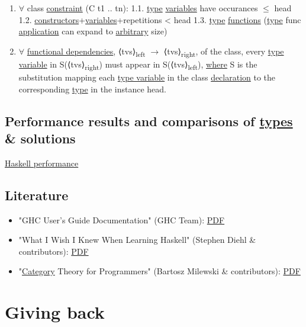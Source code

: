 \documentclass[a4paper,14pt,oneside]{book}
\begin{document}
\begin{enumerate}
\item \(\forall\) class \hyperref[org8d5887d]{constraint} (C t1 .. tn):
1.1. \hyperref[orgcb0bd28]{type} \hyperref[orgd1b5b70]{variables} have occurances \(\le\) head
1.2. \hyperref[org53203b9]{constructors}+\hyperref[orgd1b5b70]{variables}+repetitions < head
1.3. \textlnot{} \hyperref[orgcb0bd28]{type} \hyperref[org386903e]{functions} (\hyperref[orgcb0bd28]{type} func \hyperref[org422514c]{application} can expand to \hyperref[orga2a9170]{arbitrary} size)
\item \(\forall\) \hyperref[orgd4aef5b]{functional dependencies}, ⟨tvs⟩\textsubscript{left} \(\to\) ⟨tvs⟩\textsubscript{right}, of the class, every \hyperref[org44e783d]{type variable} in S(⟨tvs⟩\textsubscript{right}) must appear in S(⟨tvs⟩\textsubscript{left}), \hyperref[org8793f3c]{where} S is the substitution mapping each \hyperref[org44e783d]{type variable} in the class \hyperref[orga50a997]{declaration} to the corresponding \hyperref[orgcb0bd28]{type} in the instance head.
\end{enumerate}

\chapter{Performance results and comparisons of \hyperref[org06447a0]{types} \& solutions}
\label{sec:org3469644}
\href{https://github.com/haskell-perf}{Haskell performance}

\chapter{Literature}
\label{sec:orga083a7d}

\begin{itemize}
\item "GHC User’s Guide Documentation" (GHC Team): \href{https://downloads.haskell.org/\~ghc/latest/docs/users\_guide.pdf}{PDF}
\item "What I Wish I Knew When Learning Haskell" (Stephen Diehl \& contributors): \href{http://dev.stephendiehl.com/hask/tutorial.pdf}{PDF}
\item "\hyperref[org2e01d2a]{Category} Theory for Programmers" (Bartosz Milewski \& contributors): \href{https://s3.amazonaws.com/milewski-ctfp-pdf/category-theory-for-programmers.pdf}{PDF}
\end{itemize}

\part{Giving back}
\label{sec:orgd7dcbe2}
\end{document}
